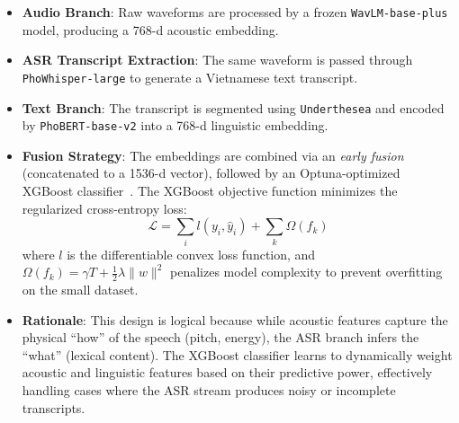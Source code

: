 \documentclass[12pt,a4paper]{report}
\begin{document}
\begin{itemize}
    \item \textbf{Audio Branch}: Raw waveforms are processed by a frozen \texttt{WavLM-base-plus} model, producing a 768-d acoustic embedding.
    \item \textbf{ASR Transcript Extraction}: The same waveform is passed through \texttt{PhoWhisper-large} to generate a Vietnamese text transcript.
    \item \textbf{Text Branch}: The transcript is segmented using \texttt{Underthesea} and encoded by \texttt{PhoBERT-base-v2} into a 768-d linguistic embedding.
    \item \textbf{Fusion Strategy}: The embeddings are combined via an \textit{early fusion} (concatenated to a 1536-d vector), followed by an Optuna-optimized XGBoost classifier~\cite{chen2016xgboost}. The XGBoost objective function minimizes the regularized cross-entropy loss:
    \begin{equation}
        \mathcal{L} = \sum_{i} l(y_i, \hat{y}_i) + \sum_{k} \Omega(f_k)
    \end{equation}
    where $l$ is the differentiable convex loss function, and $\Omega(f_k) = \gamma T + \frac{1}{2}\lambda \|w\|^2$ penalizes model complexity to prevent overfitting on the small dataset.
    \item \textbf{Rationale}: This design is logical because while acoustic features capture the physical ``how'' of the speech (pitch, energy), the ASR branch infers the ``what'' (lexical content). The XGBoost classifier learns to dynamically weight acoustic and linguistic features based on their predictive power, effectively handling cases where the ASR stream produces noisy or incomplete transcripts.
\end{itemize}
\end{document}
